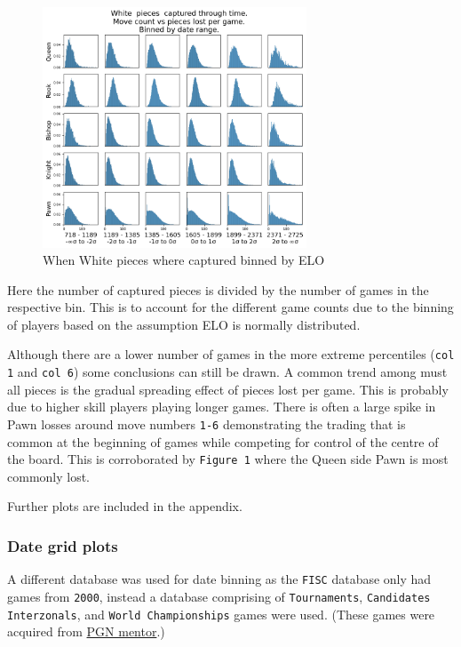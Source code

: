 \documentclass[11pt]{article}
\begin{document}
\begin{figure}[htbp]
\centering
\includegraphics[width=0.7\textwidth]{Images/_HIST_Queen_Rook_Bishop_Knight_Pawn_WHITE_ELO_FISC.png}
\caption{When White pieces where captured binned by ELO}
\end{figure}

Here the number of captured pieces is divided by the number of games in the respective bin. This is to account for the different game counts due to the binning of players based on the assumption ELO is normally distributed.

Although there are a lower number of games in the more extreme percentiles (\texttt{col 1} and \texttt{col 6}) some conclusions can still be drawn.
A common trend among must all pieces is the gradual spreading effect of pieces lost per game. This is probably due to higher skill players playing longer games.
There is often a large spike in Pawn losses around move numbers \texttt{1-6} demonstrating the trading that is common at the beginning of games while competing for control of the centre of the board. This is corroborated by \texttt{Figure 1} where the Queen side Pawn is most commonly lost.

Further plots are included in the appendix.
\subsubsection{Date grid plots}
\label{sec:orgff506b2}
A different database was used for date binning as the \texttt{FISC} database only had games from \texttt{2000}, instead a database comprising of \texttt{Tournaments}, \texttt{Candidates} \texttt{Interzonals}, and \texttt{World Championships} games were used. (These games were acquired from \href{https://www.pgnmentor.com/files.html\#events}{PGN mentor}.)
\end{document}
